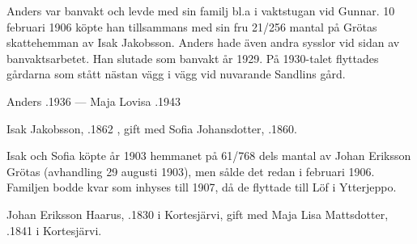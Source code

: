 Anders var banvakt och levde med sin familj bl.a i vaktstugan vid Gunnar. 10 februari 1906 köpte han tillsammans med sin fru 21/256 mantal på Grötas skattehemman av Isak Jakobsson. Anders hade även andra sysslor vid sidan av banvaktsarbetet. Han slutade som banvakt år 1929. På 1930-talet flyttades gårdarna som stått nästan vägg i vägg vid nuvarande Sandlins gård.

Anders .1936  ---  Maja Lovisa .1943


%
Isak Jakobsson, .1862 , gift med Sofia Johansdotter, .1860.
\begin{jhchildren}
  \item {}
  \item {}
  \item {}
  \item {}
  \item {}
\end{jhchildren}

Isak och Sofia köpte år 1903 hemmanet på 61/768 dels mantal av Johan Eriksson Grötas (avhandling 29 augusti 1903), men sålde det redan i februari 1906. Familjen bodde kvar som inhyses till 1907, då de flyttade till Löf i Ytterjeppo.


%
Johan Eriksson Haarus, .1830 i Kortesjärvi, gift med Maja Lisa Mattsdotter, .1841 i Kortesjärvi.
\begin{jhchildren}
  \item {}
  \item {}
  \item {}
  \item {}
  \item {}
  \item {}
  \item {}
\end{jhchildren}

